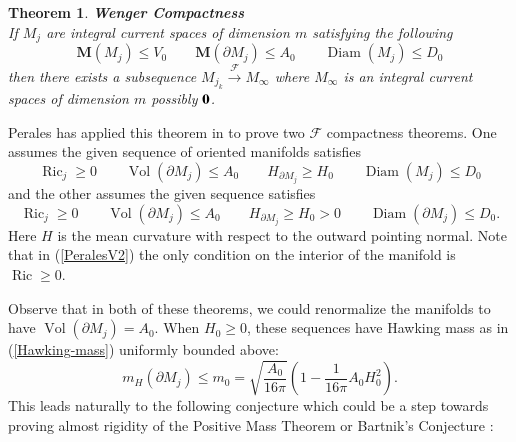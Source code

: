 \documentclass[12pt]{amsart}
\newtheorem{thm}{Theorem}[section]
\begin{document}
\begin{thm}{\em \bf Wenger Compactness}\\
If $M_j$ are integral current spaces of dimension $m$ satisfying the following
\begin{equation}\label{Wenger-comp}
{{\mathbf M}}(M_j) \le V_0 \qquad {{\mathbf M}}(\partial M_j) \le A_0 \qquad {\operatorname{Diam}}(M_j) \le D_0
\end{equation}
then there exists a subsequence $M_{j_k} {\stackrel {\mathcal{F}}{\longrightarrow} } M_\infty$ where
$M_\infty$ is an integral current spaces of dimension $m$
possibly $\bf{0}$.
\end{thm}

Perales has applied this theorem in \cite{Perales-Vol}
to prove two $\mathcal{F}$ compactness
theorems.  One assumes the given sequence of oriented manifolds satisfies
\begin{equation}\label{PeralesV1}
{\operatorname{Ric}}_j \ge 0 \qquad {\operatorname{Vol}}(\partial M_j) \le A_0 \qquad H_{\partial M_j} \ge H_0
\qquad {\operatorname{Diam}}(M_j) \le D_0
\end{equation}
and the other assumes the given sequence satisfies
\begin{equation}\label{PeralesV2}
{\operatorname{Ric}}_j \ge 0 \qquad {\operatorname{Vol}}(\partial M_j) \le A_0 \qquad H_{\partial M_j} \ge H_0>0
\qquad {\operatorname{Diam}}(\partial M_j) \le D_0.
\end{equation}
Here $H$ is the mean curvature with respect to the outward pointing normal.
Note that in (\ref{PeralesV2}) the only condition on the interior of the
manifold is ${\operatorname{Ric}}\ge 0$.

Observe that in both of these theorems, we could renormalize the
manifolds to have ${\operatorname{Vol}}(\partial M_j) = A_0$.   When $H_0\ge 0$, these sequences
have Hawking mass as in (\ref{Hawking-mass}) uniformly bounded above:
\begin{equation}
 m_H(\partial M_j)
\le m_0=\sqrt{\frac{A_0}{16\pi}}
\left(1 - \frac{1}{16\pi}A_0 H_0^2\right).
\end{equation}
This leads naturally to the following conjecture 
which could be a step towards proving almost rigidity of
the Positive Mass Theorem or Bartnik's Conjecture \cite{Bartnik}:
\end{document}
